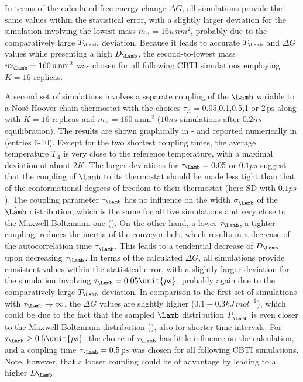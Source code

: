 In terms of the calculated free-energy change $\Delta G$, all simulations provide the same 
values within the statistical error, with a slightly larger deviation for the simulation 
involving the lowest mass $m_{\Lambda}=16\unit{u\,nm^2}$, probably due to the comparatively large $T_{\Lamb}$ deviation.
%
Because it leads to accurate $T_{\Lamb}$ and $\Delta G$ values while presenting a high $D_{\Lamb}$,
the second-to-lowest mass $m_\Lamb=160\,\mathrm{u\,nm^2}$ was chosen for all 
following CBTI simulations employing $K=16$ replicas. 


A second set of simulations involves a separate coupling of the $\Lamb$ variable to a 
Nos\'e-Hoover chain thermostat with the
choices $\tau_\Lambda=$0.05,0.1,0.5,1 or 2$\,\mathrm{ps}$
along with $K=16$ replicas and $m_{\Lambda}=160\,\mathrm{u}\,\mathrm{nm}^2$
($10\unit{ns}$ simulations after $0.2\unit{ns}$ equilibration).
%
The results are shown graphically in  - 
 and reported numerically in  (entries 6-10).
%
Except for the two shortest coupling times,
the average temperature $T_\Lambda$ is very close to the reference temperature, with a maximal
deviation of about $2\unit{K}$. The larger deviations for $\tau_{\Lamb}=0.05$ or $0.1\unit{ps}$ suggest that the coupling of $\Lamb$ to its thermostat should be made less tight than that of the conformational degrees of freedom to their thermostat (here SD with $0.1\unit{ps}$). The coupling parameter $\tau_{\Lamb}$ has no
influence on the width $\sigma_{\dot{\Lamb}}$ of the $\dot{\Lamb}$ distribution,  which is the
same for all five simulations and very close to the Maxwell-Boltzmann one (). 
On the other hand, a lower $\tau_{\Lamb}$, \ie{} a tighter coupling, reduces the
inertia of the conveyor belt, which results in a decrease of the autocorrelation time $\tau_{\dot{\Lamb}}$. This leads to a tendential decrease of $D_{\Lamb}$ upon decreasing $\tau_{\Lamb}$.
%
In terms of the calculated $\Delta G$, all simulations provide consistent values within the statistical error, with a slightly larger deviation for the simulation involving $\tau_{\Lamb}=0.05\unit{ps}$, probably again due to the comparatively large $T_{\Lamb}$ deviation. 
%
In comparison to the first set of simulations with $\tau_{\Lamb}\rightarrow \infty$, the $\Delta G$ values are slightly higher ($0.1-0.3\unit{kJ\,mol^{-1}}$), which could be due to the fact that the sampled $\dot{\Lamb}$ distribution $P_{\dot{\Lamb}}$ is even closer to the Maxwell-Boltzmann distribution (), also for shorter time intervals.
%
For $\tau_{\Lamb}\geq 0.5\unit{ps}$, the choice of $\tau_{\Lamb}$ has little influence on the calculation, and a coupling time $\tau_{\Lamb}=0.5\,\mathrm{ps}$
was chosen for all following CBTI simulations. Note, however, that a looser coupling could be of advantage by leading to a higher $D_{\Lamb}$.


